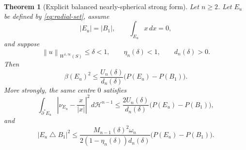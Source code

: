 \documentclass[11pt]{amsart}
\newtheorem{theorem}{Theorem}[section]
\theoremstyle{definition}
\newcommand{\Hn}{\mathcal H^{n-1}}
\newcommand{\Per}{P}
\newcommand{\norm}[1]{\left\|#1\right\|}
\begin{document}
\begin{theorem}[Explicit balanced nearly-spherical strong form]
\label{thm:graph-main}
Let \(n\ge2\).  Let \(E_u\) be defined by \eqref{eq:radial-set}, assume
\[
   |E_u|=|B_1|,\qquad \int_{E_u}x\,dx=0,
\tag{3.17}\label{eq:graph-balanced}
\]
and suppose
\[
   \norm{u}_{W^{1,\infty}(S)}\le\delta<1,\qquad
   \eta_n(\delta)<1,\qquad d_n(\delta)>0.
\tag{3.18}\label{eq:graph-hyp}
\]
Then
\[
   \beta(E_u)^2
   \le \frac{U_n(\delta)}{d_n(\delta)}
      \bigl(\Per(E_u)-\Per(B_1)\bigr).
\tag{3.19}\label{eq:graph-beta}
\]
More strongly, the same centre \(0\) satisfies
\[
   \int_{\partial^*E_u}
       \left|\nu_{E_u}-\frac{x}{|x|}\right|^2\,d\Hn
   \le
   \frac{2U_n(\delta)}{d_n(\delta)}
      \bigl(\Per(E_u)-\Per(B_1)\bigr),
\tag{3.20}\label{eq:graph-normal-bound}
\]
and
\[
   |E_u\mathbin{\triangle}B_1|^2
   \le
   \frac{M_{n-1}(\delta)^2\omega_n}
        {2(1-\eta_n(\delta))d_n(\delta)}
      \bigl(\Per(E_u)-\Per(B_1)\bigr).
\tag{3.21}\label{eq:graph-volume-bound}
\]
\end{theorem}
\end{document}
